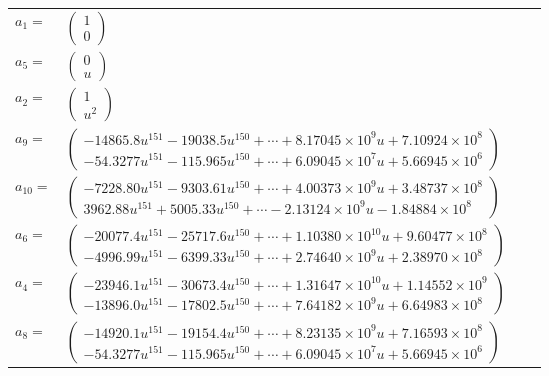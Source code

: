 \documentclass[1p]{elsarticle_modified}
\theoremstyle{definition}
\begin{document}
\begin{tabular}{m{7pt} m{180pt} m{7pt} m{180pt} }
\flushright $a_{1}=$&$\begin{pmatrix}1\\0\end{pmatrix}$ \\
\flushright $a_{5}=$&$\begin{pmatrix}0\\u\end{pmatrix}$ \\
\flushright $a_{2}=$&$\begin{pmatrix}1\\u^2\end{pmatrix}$ \\
\flushright $a_{9}=$&$\begin{pmatrix}-14865.8 u^{151}-19038.5 u^{150}+\cdots+8.17045\times10^{9} u+7.10924\times10^{8}\\-54.3277 u^{151}-115.965 u^{150}+\cdots+6.09045\times10^{7} u+5.66945\times10^{6}\end{pmatrix}$ \\
\flushright $a_{10}=$&$\begin{pmatrix}-7228.80 u^{151}-9303.61 u^{150}+\cdots+4.00373\times10^{9} u+3.48737\times10^{8}\\3962.88 u^{151}+5005.33 u^{150}+\cdots-2.13124\times10^{9} u-1.84884\times10^{8}\end{pmatrix}$ \\
\flushright $a_{6}=$&$\begin{pmatrix}-20077.4 u^{151}-25717.6 u^{150}+\cdots+1.10380\times10^{10} u+9.60477\times10^{8}\\-4996.99 u^{151}-6399.33 u^{150}+\cdots+2.74640\times10^{9} u+2.38970\times10^{8}\end{pmatrix}$ \\
\flushright $a_{4}=$&$\begin{pmatrix}-23946.1 u^{151}-30673.4 u^{150}+\cdots+1.31647\times10^{10} u+1.14552\times10^{9}\\-13896.0 u^{151}-17802.5 u^{150}+\cdots+7.64182\times10^{9} u+6.64983\times10^{8}\end{pmatrix}$ \\
\flushright $a_{8}=$&$\begin{pmatrix}-14920.1 u^{151}-19154.4 u^{150}+\cdots+8.23135\times10^{9} u+7.16593\times10^{8}\\-54.3277 u^{151}-115.965 u^{150}+\cdots+6.09045\times10^{7} u+5.66945\times10^{6}\end{pmatrix}$ \\

\end{tabular}
\end{document}
